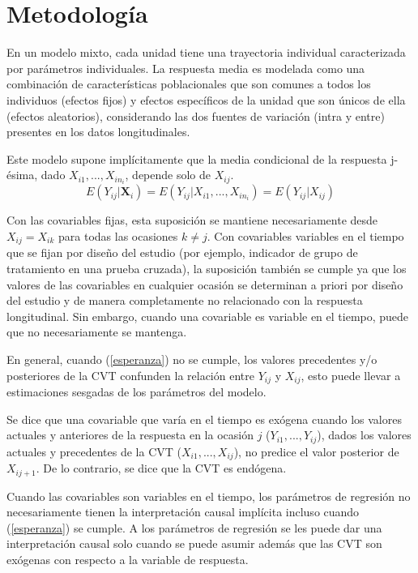 \documentclass[12pt]{article}
\def\cvt{covariable que varía en el tiempo}
\def\xseqj{$X_{i1}, ..., X_{ij}$}
\def\xseqn{$X_{i1}, ..., X_{in_i}$}
\def\yseqj{$Y_{i1}, ..., Y_{ij}$}
\begin{document}
\newpage
\section{Metodología}

En un modelo mixto, cada unidad tiene una trayectoria individual caracterizada por parámetros individuales.
La respuesta media es modelada como una combinación de características poblacionales que son comunes a todos los
individuos (efectos fijos) y efectos específicos de la unidad que son únicos de ella (efectos aleatorios),
considerando las dos fuentes de variación (intra y entre) presentes en los datos longitudinales.

Este modelo supone implícitamente que la media condicional de la respuesta j-ésima, dado \xseqn{}, depende solo de $X_{ij}$.
\begin{equation}
\label{esperanza}
	E(Y_{ij}|\bm{X}_i) = E(Y_{ij}|X_{i1}, ..., X_{in_i}) = E(Y_{ij}|X_{ij})
\end{equation}

Con las covariables fijas, esta suposición se mantiene necesariamente desde $X_{ij} = X_{ik}$ para todas las ocasiones
$k \neq j$. Con covariables variables en el tiempo que se fijan por diseño del estudio (por ejemplo, indicador
de grupo de tratamiento en una prueba cruzada), la suposición también se cumple ya que los valores de las covariables
en cualquier ocasión se determinan a priori por diseño del estudio y de manera completamente no relacionado con la
respuesta longitudinal. Sin embargo, cuando una covariable es variable en el tiempo, puede que no necesariamente se mantenga.

En general, cuando (\ref{esperanza}) no se cumple, los valores precedentes y/o posteriores de la CVT confunden la
relación entre $Y_{ij}$ y $X_{ij}$, esto puede llevar a estimaciones sesgadas de los parámetros del modelo.

Se dice que una \cvt{} es exógena cuando los valores actuales y anteriores de la respuesta en la ocasión
$j$ (\yseqj{}), dados los valores actuales y precedentes de la CVT (\xseqj{}), no predice el valor
posterior de $X_{ij+1}$. De lo contrario, se dice que la CVT es endógena.

Cuando las covariables son variables en el tiempo, los parámetros de regresión no
necesariamente tienen la interpretación causal implícita incluso cuando (\ref{esperanza}) se cumple. A los parámetros de
regresión se les puede dar una interpretación causal solo cuando se puede asumir además que las CVT son exógenas con
respecto a la variable de respuesta.
\end{document}

